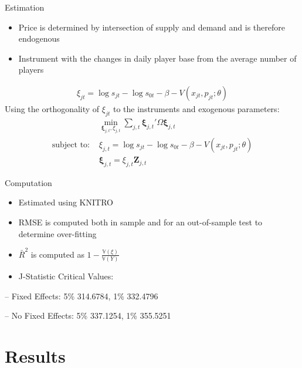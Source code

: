 \documentclass[presentation]{beamer}
\begin{document}
\begin{frame}[label={sec:orgf9116c9}]{Estimation}
\begin{itemize}
\item Price is determined by intersection of supply and demand and is
therefore endogenous
\item Instrument with the changes in daily player base from the average
number of players
\end{itemize}

\begin{align*}
  \xi_{jt} = \log s_{jt} - \log s_{0t} - \beta - V( x_{jt}, p_{jt}; \theta)
\end{align*}
Using the orthogonality of \(\xi_{jt}\) to the instruments and exogenous
parameters:
\begin{align*}
  &\min_{\bm{\xi}_{j,t}, \xi_{j,t}} \sum_{j,t}\bm{\xi}_{j,t}' \Omega \bm{\xi}_{j,t}\\
  \text{subject to: } &\xi_{j,t} = \log s_{jt} - \log s_{0t} - \beta - V( x_{jt}, p_{jt}; \theta)\\
  &\bm{\xi}_{j,t} = \xi_{j,t} \bm{Z}_{j,t}  
\end{align*}
\end{frame}

\begin{frame}[label={sec:orgc88c03f}]{Computation}
\begin{itemize}
\item Estimated using KNITRO
\item RMSE is computed both in sample and for an out-of-sample test to
determine over-fitting
\item \(\bar{R}^2\) is computed as \(1 - \frac{\mathbb{V}(\xi)}{\mathbb{V}(Y)}\)
\item J-Statistic  Critical Values:
\end{itemize}
-- Fixed Effects: 5\% 314.6784, 1\% 332.4796


-- No Fixed Effects: 5\% 337.1254, 1\% 355.5251
\end{frame}
\section{Results}
\label{sec:orgf9f9ba9}
\end{document}
